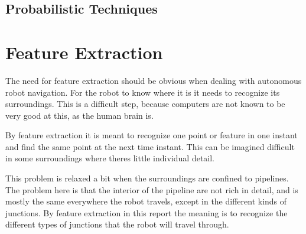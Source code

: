 \subsection{Probabilistic Techniques}



\section{Feature Extraction}
\label{chap2:sec-feature-extraction}
The need for feature extraction should be obvious when dealing with autonomous robot
navigation. For the robot to know where it is it needs to recognize its surroundings. This
is a difficult step, because computers are not known to be very good at this, as the human
brain is. 

By feature extraction it is meant to recognize one point or feature in one instant and
find the same point at the next time instant. This can be imagined difficult in some
surroundings where theres little individual detail. 

This problem is relaxed a bit when the surroundings are confined to pipelines. The problem
here is that the interior of the pipeline are not rich in detail, and is mostly the same
everywhere the robot travels, except in the different kinds of junctions. By feature
extraction in this report the meaning is to recognize the different types of junctions
that the robot will travel through. 


